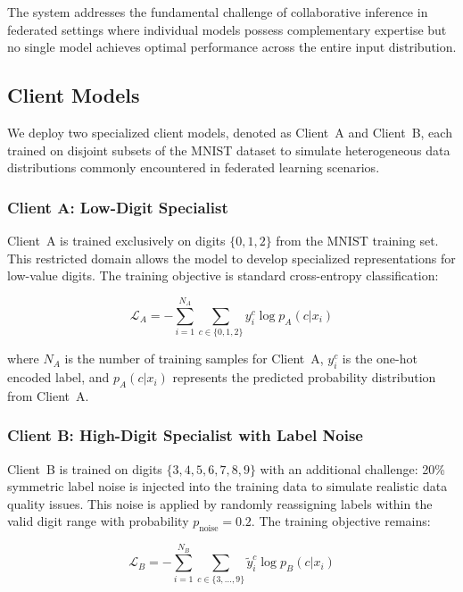 \documentclass[12pt]{article}
\begin{document}
The system addresses the fundamental challenge of collaborative inference in federated settings where individual models possess complementary expertise but no single model achieves optimal performance across the entire input distribution.

\subsection{Client Models}
\label{subsec:client_models}

We deploy two specialized client models, denoted as Client~A and Client~B, each trained on disjoint subsets of the MNIST dataset to simulate heterogeneous data distributions commonly encountered in federated learning scenarios.

\subsubsection{Client A: Low-Digit Specialist}

Client~A is trained exclusively on digits $\{0, 1, 2\}$ from the MNIST training set. This restricted domain allows the model to develop specialized representations for low-value digits. The training objective is standard cross-entropy classification:

\begin{equation}
\mathcal{L}_A = -\sum_{i=1}^{N_A} \sum_{c \in \{0,1,2\}} y_i^c \log p_A(c | x_i)
\end{equation}

where $N_A$ is the number of training samples for Client~A, $y_i^c$ is the one-hot encoded label, and $p_A(c | x_i)$ represents the predicted probability distribution from Client~A.

\subsubsection{Client B: High-Digit Specialist with Label Noise}

Client~B is trained on digits $\{3, 4, 5, 6, 7, 8, 9\}$ with an additional challenge: 20\% symmetric label noise is injected into the training data to simulate realistic data quality issues. This noise is applied by randomly reassigning labels within the valid digit range with probability $p_{\text{noise}} = 0.2$. The training objective remains:

\begin{equation}
\mathcal{L}_B = -\sum_{i=1}^{N_B} \sum_{c \in \{3,\ldots,9\}} \tilde{y}_i^c \log p_B(c | x_i)
\end{equation}
\end{document}
